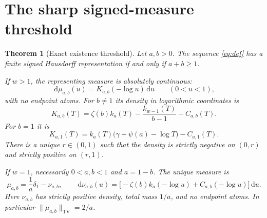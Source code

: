 \documentclass[11pt]{article}
\numberwithin{equation}{section}
\newtheorem{theorem}{Theorem}[section]
\theoremstyle{definition}\newtheorem{definition}[theorem]{Definition}
\theoremstyle{remark}\newtheorem{remark}[theorem]{Remark}
\newcommand{\dd}{\,\mathrm d}
\begin{document}
\section{The sharp signed-measure threshold}
\label{sec:threshold}

\begin{theorem}[Exact existence threshold]\label{thm:threshold}
Let $a,b>0$. The sequence \eqref{eq:def} has a finite signed
Hausdorff representation if and only if $a+b\ge1$.

If $w>1$, the representing measure is absolutely continuous:
\begin{equation}\label{eq:mu-density}
 \dd\mu_{a,b}(u)=K_{a,b}(-\log u)\dd u\qquad(0<u<1),
\end{equation}
with no endpoint atoms. For $b\ne1$ its density in logarithmic
coordinates is
\begin{equation}\label{eq:K}
 K_{a,b}(T)=\zeta(b)k_a(T)-\frac{k_{w-1}(T)}{b-1}-C_{a,b}(T).
\end{equation}
For $b=1$ it is
\begin{equation}\label{eq:K1}
 K_{a,1}(T)=k_a(T)\bigl(\gamma+\psi(a)-\log T\bigr)-C_{a,1}(T).
\end{equation}
There is a unique $r\in(0,1)$ such that the density is strictly
negative on $(0,r)$ and strictly positive on $(r,1)$.

If $w=1$, necessarily $0<a,b<1$ and $a=1-b$. The unique measure is
\begin{equation}\label{eq:criticalmeasure}
 \mu_{a,b}=\frac1a\delta_1-\nu_{a,b},\qquad
 \dd\nu_{a,b}(u)=
 \bigl[-\zeta(b)k_a(-\log u)+C_{a,b}(-\log u)\bigr]\dd u.
\end{equation}
Here $\nu_{a,b}$ has strictly positive density, total mass $1/a$,
and no endpoint atoms. In particular $\|\mu_{a,b}\|_{\mathrm{TV}}=2/a$.
\end{theorem}
\end{document}
